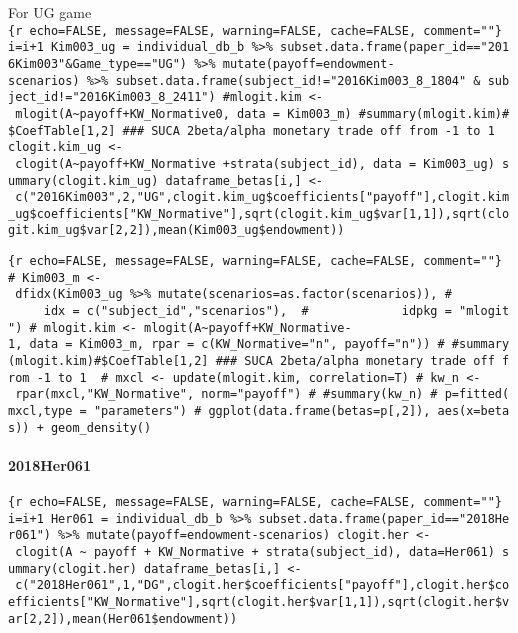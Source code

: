 For UG game
\texttt{\{r\ echo=FALSE,\ message=FALSE,\ warning=FALSE,\ cache=FALSE,\ comment=""\}\ i=i+1\ Kim003\_ug\ =\ individual\_db\_b\ \%\textgreater{}\%\ subset.data.frame(paper\_id=="2016Kim003"\&Game\_type=="UG")\ \%\textgreater{}\%\ mutate(payoff=endowment-scenarios)\ \%\textgreater{}\%\ subset.data.frame(subject\_id!="2016Kim003\_8\_1804"\ \&\ subject\_id!="2016Kim003\_8\_2411")\ \#mlogit.kim\ \textless{}-\ mlogit(A\textasciitilde{}payoff+KW\_Normative\textbar{}0,\ data\ =\ Kim003\_m)\ \#summary(mlogit.kim)\#\$CoefTable{[}1,2{]}\ \#\#\#\ SUCA\ 2beta/alpha\ monetary\ trade\ off\ from\ -1\ to\ 1\ \ clogit.kim\_ug\ \textless{}-\ clogit(A\textasciitilde{}payoff+KW\_Normative\ +strata(subject\_id),\ data\ =\ Kim003\_ug)\ summary(clogit.kim\_ug)\ dataframe\_betas{[}i,{]}\ \textless{}-\ c("2016Kim003",2,"UG",clogit.kim\_ug\$coefficients{[}"payoff"{]},clogit.kim\_ug\$coefficients{[}"KW\_Normative"{]},sqrt(clogit.kim\_ug\$var{[}1,1{]}),sqrt(clogit.kim\_ug\$var{[}2,2{]}),mean(Kim003\_ug\$endowment))}

\texttt{\{r\ echo=FALSE,\ message=FALSE,\ warning=FALSE,\ cache=FALSE,\ comment=""\}\ \#\ Kim003\_m\ \textless{}-\ dfidx(Kim003\_ug\ \%\textgreater{}\%\ mutate(scenarios=as.factor(scenarios)),\ \#\ \ \ \ \ \ \ \ \ \ \ \ \ idx\ =\ c("subject\_id","scenarios"),\ \ \#\ \ \ \ \ \ \ \ \ \ \ \ \ idpkg\ =\ "mlogit")\ \#\ mlogit.kim\ \textless{}-\ mlogit(A\textasciitilde{}payoff+KW\_Normative\textbar{}-1,\ data\ =\ Kim003\_m,\ rpar\ =\ c(KW\_Normative="n",\ payoff="n"))\ \#\ \#summary(mlogit.kim)\#\$CoefTable{[}1,2{]}\ \#\#\#\ SUCA\ 2beta/alpha\ monetary\ trade\ off\ from\ -1\ to\ 1\ \ \#\ mxcl\ \textless{}-\ update(mlogit.kim,\ correlation=T)\ \#\ kw\_n\ \textless{}-\ rpar(mxcl,"KW\_Normative",\ norm="payoff")\ \#\ \#summary(kw\_n)\ \#\ p=fitted(mxcl,type\ =\ "parameters")\ \#\ ggplot(data.frame(betas=p{[},2{]}),\ aes(x=betas))\ +\ geom\_density()}

\hypertarget{her061}{%
\paragraph{2018Her061}\label{her061}}

\texttt{\{r\ echo=FALSE,\ message=FALSE,\ warning=FALSE,\ cache=FALSE,\ comment=""\}\ i=i+1\ Her061\ =\ individual\_db\_b\ \%\textgreater{}\%\ subset.data.frame(paper\_id=="2018Her061")\ \%\textgreater{}\%\ mutate(payoff=endowment-scenarios)\ clogit.her\ \textless{}-\ clogit(A\ \textasciitilde{}\ payoff\ +\ KW\_Normative\ +\ strata(subject\_id),\ data=Her061)\ summary(clogit.her)\ dataframe\_betas{[}i,{]}\ \textless{}-\ c("2018Her061",1,"DG",clogit.her\$coefficients{[}"payoff"{]},clogit.her\$coefficients{[}"KW\_Normative"{]},sqrt(clogit.her\$var{[}1,1{]}),sqrt(clogit.her\$var{[}2,2{]}),mean(Her061\$endowment))}

